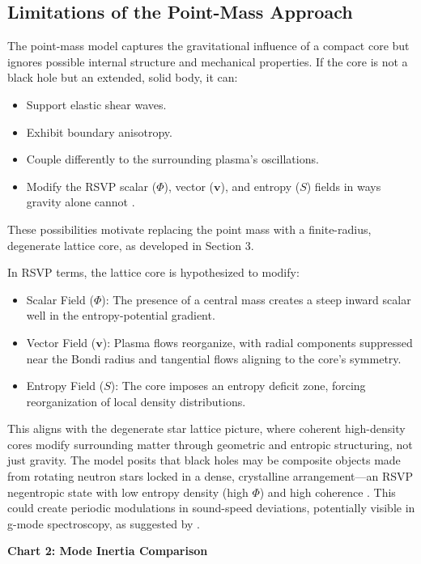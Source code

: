 \documentclass{article}
\begin{document}
\subsection{Limitations of the Point-Mass Approach}

The point-mass model captures the gravitational influence of a compact core but ignores possible internal structure and mechanical properties. If the core is not a black hole but an extended, solid body, it can:
\begin{itemize}
\item Support elastic shear waves.
\item Exhibit boundary anisotropy.
\item Couple differently to the surrounding plasma’s oscillations.
\item Modify the RSVP scalar ($\Phi$), vector ($\mathbf{v}$), and entropy ($S$) fields in ways gravity alone cannot \citep{markovic1995, kunitomo2022}.
\end{itemize}
These possibilities motivate replacing the point mass with a finite-radius, degenerate lattice core, as developed in Section 3.

In RSVP terms, the lattice core is hypothesized to modify:
\begin{itemize}
\item Scalar Field ($\Phi$): The presence of a central mass creates a steep inward scalar well in the entropy-potential gradient.
\item Vector Field ($\mathbf{v}$): Plasma flows reorganize, with radial components suppressed near the Bondi radius and tangential flows aligning to the core’s symmetry.
\item Entropy Field ($S$): The core imposes an entropy deficit zone, forcing reorganization of local density distributions.
\end{itemize}
This aligns with the degenerate star lattice picture, where coherent high-density cores modify surrounding matter through geometric and entropic structuring, not just gravity. The model posits that black holes may be composite objects made from rotating neutron stars locked in a dense, crystalline arrangement---an RSVP negentropic state with low entropy density (high $\Phi$) and high coherence \citep{markovic1995, kunitomo2022}. This could create periodic modulations in sound-speed deviations, potentially visible in g-mode spectroscopy, as suggested by \citet{bellinger2025}.

\textbf{Chart 2: Mode Inertia Comparison}
\end{document}

